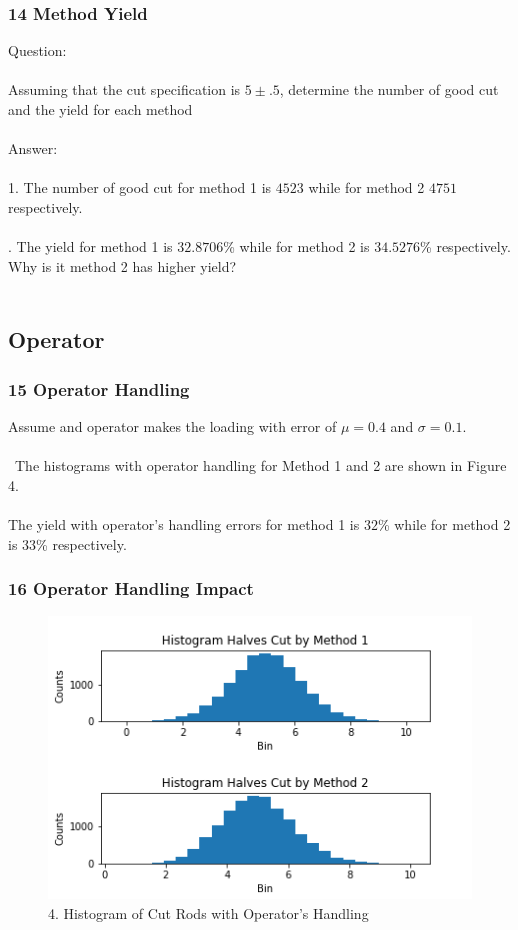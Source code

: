 \documentclass[11pt]{beamer}
\begin{document}
\begin{frame}
\frametitle{14 Method Yield}
\noindent Question: \\ \ \\    Assuming that the cut specification is $5 \pm .5$,    determine the number of good cut and the yield for each method \\ \ \\ 
\noindent Answer: \\ \ \\ 1. The number of good cut for method 1 is $4523 $ while for method 2 $4751 $ respectively. \\ \ \\ 
. The yield for method 1 is $32.8706 $\% while for method 2 is $34.5276 $\% respectively. Why is it method 2 has higher yield? \\ \ \\    \subsection{Operator} 

\end{frame}

\begin{frame}
\frametitle{15 Operator Handling}
\noindent Assume and operator makes the loading with error of $\mu = 0.4 $ and $\sigma = 0.1 $. \\ \ \\ \ The histograms with operator    handling for Method 1 and 2 are shown in Figure 4. \\ \ \\    The yield with operator's handling errors for method 1 is $32 $\% while for method 2 is $33 $\% respectively.

\end{frame}

\begin{frame}
\frametitle{16 Operator Handling Impact}
\begin{figure}[H]
\centering\includegraphics[width=1\linewidth,height=0.6\textheight]{Fig04}
\caption{4. Histogram of Cut Rods with    Operator's Handling}
\label{fig:Fig04}
\end{figure}


\end{frame}
\end{document}
